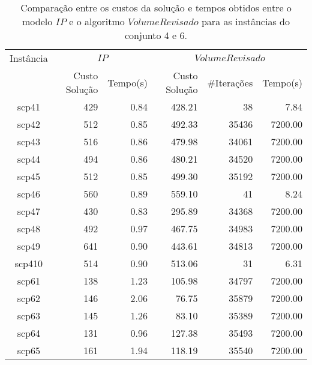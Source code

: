 \begin{table}[htbp]
\begin{center}
  \begin{tabular}{|c|r|r|r|r|r|}
    \hline
      Instância & \multicolumn{2}{|c|}{$IP$} & \multicolumn{3}{|c|}{$VolumeRevisado$}\\
                & Custo Solução    & Tempo(s)  & Custo Solução   & \#Iterações & Tempo(s)      \\ \hline
      scp41     & 429              & 0.84      & 428.21          & 38       & 7.84       \\ \hline
      scp42     & 512              & 0.85      & 492.33          & 35436    & 7200.00       \\ \hline
      scp43     & 516              & 0.86      & 479.98          & 34061    & 7200.00       \\ \hline
      scp44     & 494              & 0.86      & 480.21          & 34520    & 7200.00     \\ \hline
      scp45     & 512              & 0.85      & 499.30          & 35192    & 7200.00       \\ \hline
      scp46     & 560              & 0.89      & 559.10          & 41       & 8.24    \\ \hline
      scp47     & 430              & 0.83      & 295.89          & 34368    & 7200.00       \\ \hline
      scp48     & 492              & 0.97      & 467.75          & 34983    & 7200.00    \\ \hline
      scp49     & 641              & 0.90      & 443.61          & 34813    & 7200.00    \\ \hline
      scp410    & 514              & 0.90      & 513.06          & 31       & 6.31    \\ \hline
      scp61     & 138              & 1.23      & 105.98          & 34797    & 7200.00    \\ \hline
      scp62     & 146              & 2.06      & 76.75           & 35879    & 7200.00    \\ \hline
      scp63     & 145              & 1.26      & 83.10           & 35389    & 7200.00    \\ \hline
      scp64     & 131              & 0.96      & 127.38          & 35493    & 7200.00    \\ \hline
      scp65     & 161              & 1.94      & 118.19          & 35540    & 7200.00    \\ \hline
  \end{tabular}
\caption{Comparação entre os custos da solução e tempos obtidos entre o modelo $IP$ e o algoritmo $VolumeRevisado$ para as instâncias do conjunto 4 e 6.}
\label{table:resultados4e6}
\end{center}
\end{table}

